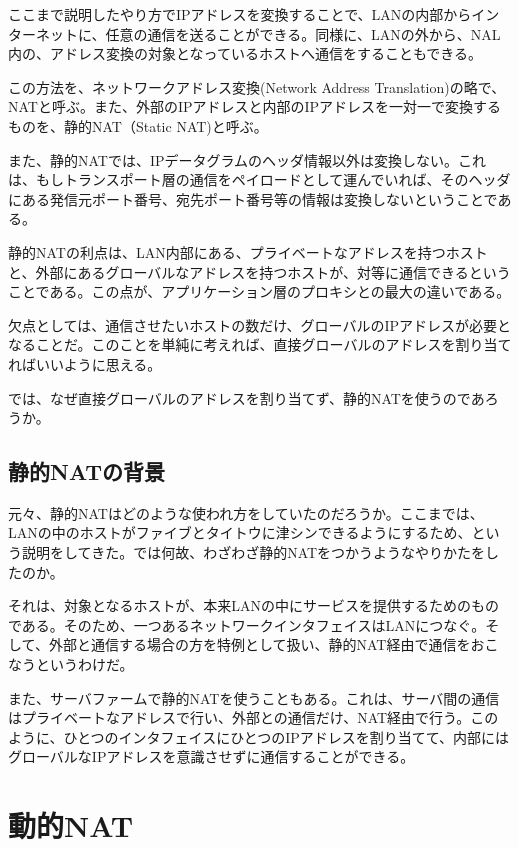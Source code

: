 ここまで説明したやり方でIPアドレスを変換することで、LANの内部からインターネットに、任意の通信を送ることができる。同様に、LANの外から、NAL内の、アドレス変換の対象となっているホストへ通信をすることもできる。

この方法を、ネットワークアドレス変換(Network Address Translation)の略で、NATと呼ぶ。また、外部のIPアドレスと内部のIPアドレスを一対一で変換するものを、静的NAT（Static NAT)と呼ぶ。

また、静的NATでは、IPデータグラムのヘッダ情報以外は変換しない。これは、もしトランスポート層の通信をペイロードとして運んでいれば、そのヘッダにある発信元ポート番号、宛先ポート番号等の情報は変換しないということである。

静的NATの利点は、LAN内部にある、プライベートなアドレスを持つホストと、外部にあるグローバルなアドレスを持つホストが、対等に通信できるということである。この点が、アプリケーション層のプロキシとの最大の違いである。

欠点としては、通信させたいホストの数だけ、グローバルのIPアドレスが必要となることだ。このことを単純に考えれば、直接グローバルのアドレスを割り当てればいいように思える。

では、なぜ直接グローバルのアドレスを割り当てず、静的NATを使うのであろうか。

\subsection{静的NATの背景}
元々、静的NATはどのような使われ方をしていたのだろうか。ここまでは、LANの中のホストがファイブとタイトウに津シンできるようにするため、という説明をしてきた。では何故、わざわざ静的NATをつかうようなやりかたをしたのか。

それは、対象となるホストが、本来LANの中にサービスを提供するためのものである。そのため、一つあるネットワークインタフェイスはLANにつなぐ。そして、外部と通信する場合の方を特例として扱い、静的NAT経由で通信をおこなうというわけだ。

また、サーバファームで静的NATを使うこともある。これは、サーバ間の通信はプライベートなアドレスで行い、外部との通信だけ、NAT経由で行う。このように、ひとつのインタフェイスにひとつのIPアドレスを割り当てて、内部にはグローバルなIPアドレスを意識させずに通信することができる。

\section{動的NAT}

